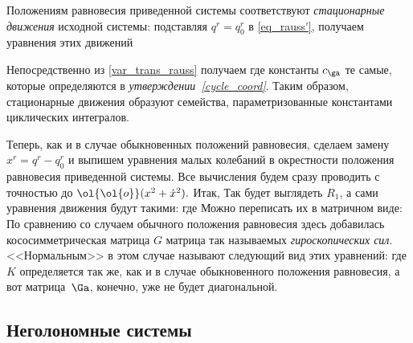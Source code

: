 \documentclass[a4paper,12pt]{article}
\newcommand{\tdf}[1]{\textsl{#1}}
\newcommand{\tstm}[1]{\emph{#1}}
\renewcommand\o{\ol{\ol{o}}}
\begin{document}
\begin{df}
Положениям равновесия приведенной системы соответствуют
\tdf{стационарные движения} исходной системы:  подставляя
$q^r=q^r_0$ в \eqref{eq_rauss'}, получаем уравнения этих
движений
\end{df}

\begin{note}
Непосредственно из \eqref{var_trans_rauss} получаем
 где константы $c_{\ga}$ те
самые, которые определяются в \tstm{утверждении~\ref{cycle_coord}}. Таким
образом, стационарные движения образуют семейства, параметризованные
константами циклических интегралов.
\end{note}

Теперь, как и в случае обыкновенных положений равновесия, сделаем
замену $x^r=q^r-q^r_0$ и выпишем уравнения малых колебаний в
окрестности положения равновесия приведенной системы. Все вычисления
будем сразу проводить с точностью до $\o(x^2+\dot{x}^2).$ Итак,
 Так будет
выглядеть $R_1$, а сами уравнения движения будут такими:
где
Можно переписать их в матричном виде:
По сравнению со случаем обычного положения равновесия здесь
добавилась кососимметрическая матрица $G$ матрица так называемых
\tdf{гироскопических сил}. <<Нормальным>> в этом случае называют
следующий вид этих уравнений: 
где $K$ определяется так же, как и в случае обыкновенного положения
равновесия, а вот матрица~$\Ga$, конечно, уже не будет диагональной.
\subsection{Неголономные системы}
\end{document}
